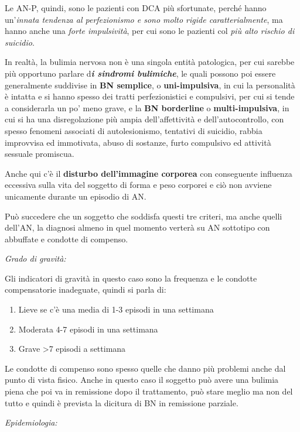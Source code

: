 \documentclass[]{article}
\begin{document}
Le AN-P, quindi, sono le pazienti con DCA più sfortunate, perché hanno
un'\emph{innata tendenza al perfezionismo e sono molto rigide
caratterialmente}, ma hanno anche una \emph{forte impulsività}, per cui
sono le pazienti col \emph{più alto rischio di suicidio}.

In realtà, la bulimia nervosa non è una singola entità patologica, per
cui sarebbe più opportuno parlare d\textbf{\emph{i sindromi bulimiche}},
le quali possono poi essere generalmente suddivise in \textbf{BN
semplice}, o \textbf{uni-impulsiva}, in cui la personalità è intatta e
si hanno spesso dei tratti perfezionistici e compulsivi, per cui si
tende a considerarla un po' meno grave, e la \textbf{BN borderline} o
\textbf{multi-impulsiva}, in cui si ha una disregolazione più ampia
dell'affettività e dell'autocontrollo, con spesso fenomeni associati di
autolesionismo, tentativi di suicidio, rabbia improvvisa ed immotivata,
abuso di sostanze, furto compulsivo ed attività sessuale promiscua.

Anche qui c'è il \textbf{disturbo dell'immagine corporea} con
conseguente influenza eccessiva sulla vita del soggetto di forma e peso
corporei e ciò non avviene unicamente durante un episodio di AN.

Può succedere che un soggetto che soddisfa questi tre criteri, ma anche
quelli dell'AN, la diagnosi almeno in quel momento verterà su AN
sottotipo con abbuffate e condotte di compenso.

\emph{\emph{Grado di gravità:}}

Gli indicatori di gravità in questo caso sono la frequenza e le condotte
compensatorie inadeguate, quindi si parla di:

\begin{enumerate}
\def\labelenumi{\arabic{enumi}.}
\item
  Lieve se c'è una media di 1-3 episodi in una settimana
\item
  Moderata 4-7 episodi in una settimana
\item
  Grave \textgreater{}7 episodi a settimana
\end{enumerate}

Le condotte di compenso sono spesso quelle che danno più problemi anche
dal punto di vista fisico. Anche in questo caso il soggetto può avere
una bulimia piena che poi va in remissione dopo il trattamento, può
stare meglio ma non del tutto e quindi è prevista la dicitura di BN in
remissione parziale.

\emph{\emph{Epidemiologia: }}
\end{document}
